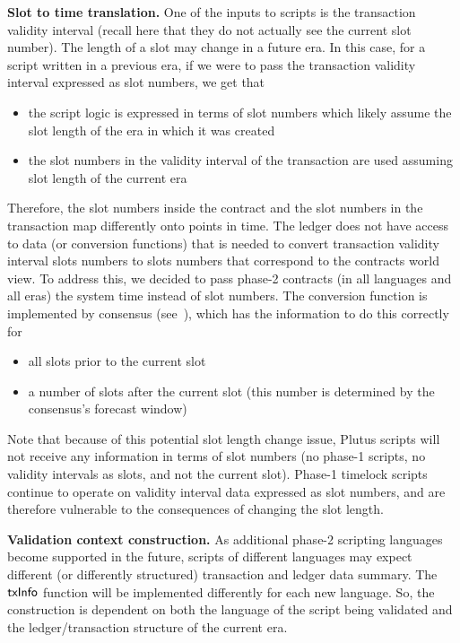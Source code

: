 \textbf{Slot to time translation.}
One of the inputs to scripts is the transaction validity interval (recall here that
they do not actually see the current slot number). The length of a
slot may change in a future era. In this case, for a script written in a previous
era, if we were to pass the transaction validity interval expressed as slot numbers,
we get that

\begin{itemize}
  \item the script logic is expressed in terms of slot numbers
  which likely assume the slot length of the era in which it was created
  \item the slot numbers in the validity interval of the transaction are used
  assuming slot length of the current era
\end{itemize}

Therefore, the slot numbers inside the contract and the slot numbers in the transaction
map differently onto points in time. The ledger does not have access to data (or conversion functions)
that is needed to convert transaction validity interval slots numbers to slots numbers
that correspond to the contracts world view. To address this, we decided to pass
phase-2 contracts (in all languages and all eras) the system time instead of slot numbers.
The conversion function is implemented by consensus (see~\cite{cardano_consensus}),
which has the information to do this correctly for

\begin{itemize}
  \item all slots prior to the current slot
  \item a number of slots after the current slot (this number is determined by
  the consensus's forecast window)
\end{itemize}

Note that because of this potential slot length change issue, Plutus scripts will
not receive any information in terms of slot numbers (no phase-1 scripts, no
validity intervals as slots, and not the current slot). Phase-1 timelock scripts
continue to operate on validity interval data expressed as slot numbers, and are
therefore vulnerable to the consequences of changing the slot length.

\textbf{Validation context construction.}
  As additional phase-2 scripting languages become supported in the future, scripts of different
  languages may expect different (or differently structured) transaction and ledger data summary.
  The $\mathsf{txInfo}$ function will be implemented differently
  for each new language. So, the construction is
  dependent on both the language of the script being validated and the ledger/transaction structure
  of the current era.

